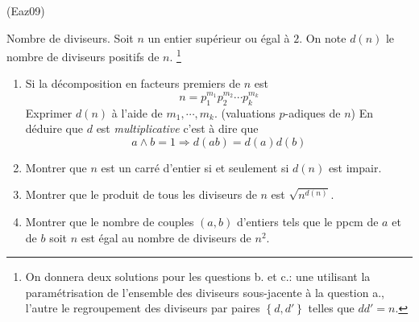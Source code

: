 \begin{tiny}(Eaz09)\end{tiny} Nombre de diviseurs.\newline
Soit $n$ un entier supérieur ou égal à $2$. On note $d(n)$ le nombre de diviseurs positifs de $n$. \footnote{On donnera deux solutions pour les questions b. et c.: une utilisant la paramétrisation de l'ensemble des diviseurs sous-jacente à la question a., l'autre le regroupement des diviseurs par paires $\left\lbrace d,d' \right\rbrace$ telles que $d d' = n$.} 
\begin{enumerate}
 \item Si la décomposition en facteurs premiers de $n$ est
\begin{displaymath}
 n=p_1^{m_1}p_2^{m_2}\cdots p_k^{m_k}
\end{displaymath}
Exprimer $d(n)$ à l'aide de $m_1,\cdots, m_k$. (valuations $p$-adiques de $n$) En déduire que $d$ est \emph{multiplicative} c'est à dire que
\begin{displaymath}
  a\wedge b = 1 \Rightarrow d(ab) = d(a)d(b)
\end{displaymath}
 \item Montrer que $n$ est un carré d'entier si et seulement si $d(n)$ est impair.
 \item Montrer que le produit de tous les diviseurs de $n$ est $\sqrt{n^{d(n)}}$.
 \item Montrer que le nombre de couples $(a,b)$ d'entiers tels que le ppcm de $a$ et de $b$ soit $n$ est égal au nombre de diviseurs de $n^2$.
\end{enumerate}
